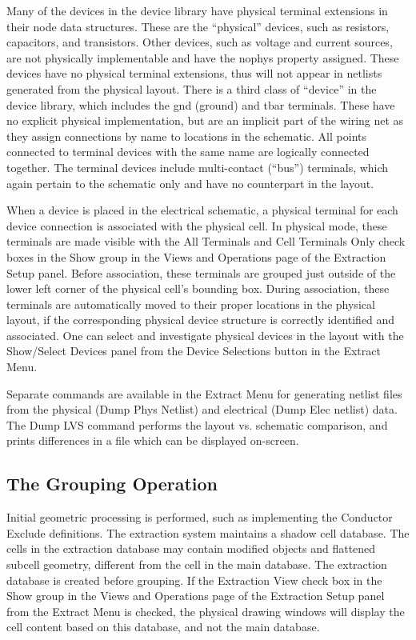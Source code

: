 Many of the devices in the device library have physical terminal
extensions in their node data structures.  These are the ``physical''
devices, such as resistors, capacitors, and transistors.  Other
devices, such as voltage and current sources, are not physically
implementable and have the {\et nophys} property assigned.  These
devices have no physical terminal extensions, thus will not appear in
netlists generated from the physical layout.  There is a third class
of ``device'' in the device library, which includes the {\et gnd}
(ground) and {\et tbar} terminals.  These have no explicit physical
implementation, but are an implicit part of the wiring net as they
assign connections by name to locations in the schematic.  All points
connected to terminal devices with the same name are logically
connected together.  The terminal devices include multi-contact
(``bus'') terminals, which again pertain to the schematic only and
have no counterpart in the layout.

When a device is placed in the electrical schematic, a physical
terminal for each device connection is associated with the physical
cell.  In physical mode, these terminals are made visible with the
{\cb All Terminals} and {\cb Cell Terminals Only} check boxes in the
{\cb Show} group in the {\cb Views and Operations} page of the {\cb
Extraction Setup} panel.  Before association, these terminals are
grouped just outside of the lower left corner of the physical cell's
bounding box.  During association, these terminals are automatically
moved to their proper locations in the physical layout, if the
corresponding physical device structure is correctly identified and
associated.  One can select and investigate physical devices in the
layout with the {\cb Show/Select Devices} panel from the {\cb Device
Selections} button in the {\cb Extract Menu}.

Separate commands are available in the {\cb Extract Menu} for
generating netlist files from the physical ({\cb Dump Phys Netlist})
and electrical ({\cb Dump Elec netlist}) data.  The {\cb Dump LVS}
command performs the layout vs.  schematic comparison, and prints
differences in a file which can be displayed on-screen.

\subsection{The Grouping Operation}

Initial geometric processing is performed, such as implementing the
{\vt Conductor Exclude} definitions.  The extraction system maintains
a shadow cell database.  The cells in the extraction database may
contain modified objects and flattened subcell geometry, different
from the cell in the main database.  The extraction database is
created before grouping.  If the {\cb Extraction View} check box in
the {\cb Show} group in the {\cb Views and Operations} page of the
{\cb Extraction Setup} panel from the {\cb Extract Menu} is checked,
the physical drawing windows will display the cell content based on
this database, and not the main database.

